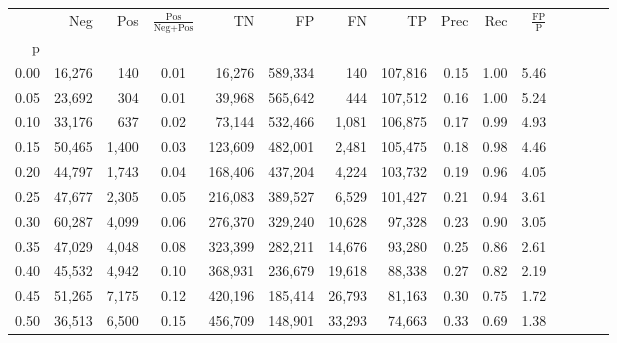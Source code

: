 \begin{tabular}{rrrcrrrrrrrrrrr}
\toprule
{} &     Neg &    Pos & $\frac{\text{Pos}}{\text{Neg}+\text{Pos}}$ &       TN &       FP &       FN &       TP &  Prec &   Rec & $\frac{\text{FP}}{\text{P}}$ \\
p    &         &        &                                            &          &          &          &          &       &       &                              \\
\midrule
0.00 &  16,276 &    140 &                                       0.01 &   16,276 &  589,334 &      140 &  107,816 &  0.15 &  1.00 &                         5.46 \\
0.05 &  23,692 &    304 &                                       0.01 &   39,968 &  565,642 &      444 &  107,512 &  0.16 &  1.00 &                         5.24 \\
0.10 &  33,176 &    637 &                                       0.02 &   73,144 &  532,466 &    1,081 &  106,875 &  0.17 &  0.99 &                         4.93 \\
0.15 &  50,465 &  1,400 &                                       0.03 &  123,609 &  482,001 &    2,481 &  105,475 &  0.18 &  0.98 &                         4.46 \\
0.20 &  44,797 &  1,743 &                                       0.04 &  168,406 &  437,204 &    4,224 &  103,732 &  0.19 &  0.96 &                         4.05 \\
0.25 &  47,677 &  2,305 &                                       0.05 &  216,083 &  389,527 &    6,529 &  101,427 &  0.21 &  0.94 &                         3.61 \\
0.30 &  60,287 &  4,099 &                                       0.06 &  276,370 &  329,240 &   10,628 &   97,328 &  0.23 &  0.90 &                         3.05 \\
0.35 &  47,029 &  4,048 &                                       0.08 &  323,399 &  282,211 &   14,676 &   93,280 &  0.25 &  0.86 &                         2.61 \\
0.40 &  45,532 &  4,942 &                                       0.10 &  368,931 &  236,679 &   19,618 &   88,338 &  0.27 &  0.82 &                         2.19 \\
0.45 &  51,265 &  7,175 &                                       0.12 &  420,196 &  185,414 &   26,793 &   81,163 &  0.30 &  0.75 &                         1.72 \\
0.50 &  36,513 &  6,500 &                                       0.15 &  456,709 &  148,901 &   33,293 &   74,663 &  0.33 &  0.69 &                         1.38 \\

\end{tabular}
